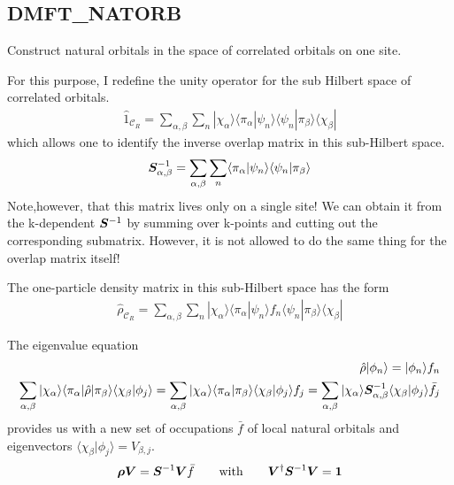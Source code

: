 \documentclass[11pt,a4paper]{report}
\begin{document}
\subsection{DMFT\_NATORB}
Construct natural orbitals in the space of correlated orbitals on one
site.

For this purpose, I redefine the unity operator for the sub Hilbert
space of correlated orbitals.
\begin{eqnarray}
\hat{1}_{\mathcal{C}_R}
=\sum_{\alpha,\beta}\sum_n
|\chi_\alpha\rangle
\langle\pi_\alpha|\psi_n\rangle\langle\psi_n|\pi_\beta\rangle
\langle\chi_\beta|
\end{eqnarray}
which allows one to identify the inverse overlap matrix in this sub-Hilbert space.
\begin{eqnarray}
\bm{S}^{-1}_{\alpha,\beta}
=\sum_{\alpha,\beta}\sum_n
\langle\pi_\alpha|\psi_n\rangle\langle\psi_n|\pi_\beta\rangle
\end{eqnarray}
Note,however, that this matrix lives only on a single site! We can
obtain it from the k-dependent $\bm{S}^{-1}$ by summing over k-points
and cutting out the corresponding submatrix. However, it is not
allowed to do the same thing for the overlap matrix itself!

The one-particle density matrix in this sub-Hilbert space has the form
\begin{eqnarray}
\hat{\rho}_{\mathcal{C}_R}
=\sum_{\alpha,\beta}\sum_n
|\chi_\alpha\rangle
\langle\pi_\alpha|\psi_n\rangle f_n \langle\psi_n|\pi_\beta\rangle
\langle\chi_\beta|
\end{eqnarray}

The eigenvalue equation
\begin{eqnarray}
\hat{\rho}|\phi_n\rangle=|\phi_n\rangle f_n
\nonumber\\
\sum_{\alpha,\beta}|\chi_\alpha\rangle
\langle\pi_\alpha|\hat{\rho}|\pi_\beta\rangle\langle\chi_\beta|\phi_j\rangle
=\sum_{\alpha,\beta}|\chi_\alpha\rangle\langle\pi_\alpha|\pi_\beta\rangle
\langle\chi_\beta|\phi_j\rangle f_j
=\sum_{\alpha,\beta}|\chi_\alpha\rangle
\bm{S}^{-1}_{\alpha,\beta}\langle\chi_\beta|\phi_j\rangle \bar{f}_j
\end{eqnarray}
provides us with a new set of occupations $\bar{f}$ of local natural
orbitals and eigenvectors
$\langle\chi_\beta|\phi_j\rangle=V_{\beta,j}$.
\begin{eqnarray}
\bm{\rho}\bm{V}=\bm{S}^{-1}\bm{V}\bar{f}
\qquad\text{with}\qquad
\bm{V}^\dagger\bm{S}^{-1}\bm{V}=\bm{1}
\end{eqnarray}
\end{document}
